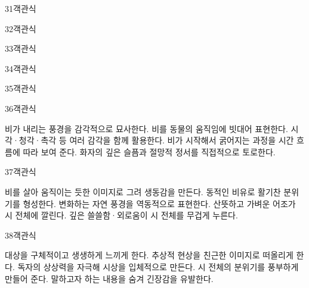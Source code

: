 \documentclass[fs9,seriesRus]{korfarm-base}
\begin{document}
\begin{kfQBlock}{31}{객관식}
\end{kfQBlock}
\begin{kfQBlock}{32}{객관식}
\end{kfQBlock}
\begin{kfQBlock}{33}{객관식}
\end{kfQBlock}
\begin{kfQBlock}{34}{객관식}
\end{kfQBlock}
\begin{kfQBlock}{35}{객관식}
\end{kfQBlock}
\begin{kfQBlock}{36}{객관식}
\begin{kfChoices}
\kfChoice 비가 내리는 풍경을 감각적으로 묘사한다.
\kfChoice 비를 동물의 움직임에 빗대어 표현한다.
\kfChoice 시각·청각·촉각 등 여러 감각을 함께 활용한다.
\kfChoice 비가 시작해서 굵어지는 과정을 시간 흐름에 따라 보여 준다.
\kfChoice 화자의 깊은 슬픔과 절망적 정서를 직접적으로 토로한다.
\end{kfChoices}
\end{kfQBlock}
\begin{kfQBlock}{37}{객관식}
\begin{kfChoices}
\kfChoice 비를 살아 움직이는 듯한 이미지로 그려 생동감을 만든다.
\kfChoice 동적인 비유로 활기찬 분위기를 형성한다.
\kfChoice 변화하는 자연 풍경을 역동적으로 표현한다.
\kfChoice 산뜻하고 가벼운 어조가 시 전체에 깔린다.
\kfChoice 깊은 쓸쓸함·외로움이 시 전체를 무겁게 누른다.
\end{kfChoices}
\end{kfQBlock}
\begin{kfQBlock}{38}{객관식}
\begin{kfChoices}
\kfChoice 대상을 구체적이고 생생하게 느끼게 한다.
\kfChoice 추상적 현상을 친근한 이미지로 떠올리게 한다.
\kfChoice 독자의 상상력을 자극해 시상을 입체적으로 만든다.
\kfChoice 시 전체의 분위기를 풍부하게 만들어 준다.
\kfChoice 말하고자 하는 내용을 숨겨 긴장감을 유발한다.
\end{kfChoices}
\end{kfQBlock}
\end{document}
